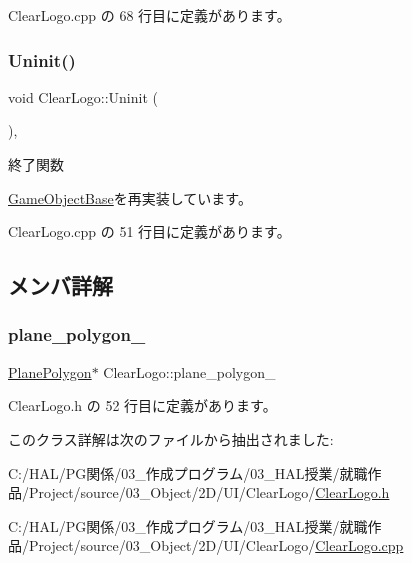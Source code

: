  Clear\+Logo.\+cpp の 68 行目に定義があります。

\mbox{\label{class_clear_logo_ab55def116615b92a8e8cc40b364b7a4c}} 
\subsubsection{\texorpdfstring{Uninit()}{Uninit()}}
{\footnotesize\ttfamily void Clear\+Logo\+::\+Uninit (\begin{DoxyParamCaption}{ }\end{DoxyParamCaption})\hspace{0.3cm}{\ttfamily [override]}, {\ttfamily [virtual]}}



終了関数 



\mbox{\hyperlink{class_game_object_base_a97e1bc277d7b1c0156d4735de29a022c}{Game\+Object\+Base}}を再実装しています。



 Clear\+Logo.\+cpp の 51 行目に定義があります。



\subsection{メンバ詳解}
\mbox{\label{class_clear_logo_ad4c1abbd7e501cc44357c9f65e12482f}} 
\subsubsection{\texorpdfstring{plane\+\_\+polygon\+\_\+}{plane\_polygon\_}}
{\footnotesize\ttfamily \mbox{\hyperlink{class_plane_polygon}{Plane\+Polygon}}$\ast$ Clear\+Logo\+::plane\+\_\+polygon\+\_\+}



 Clear\+Logo.\+h の 52 行目に定義があります。



このクラス詳解は次のファイルから抽出されました\+:\begin{DoxyCompactItemize}
\item 
C\+:/\+H\+A\+L/\+P\+G関係/03\+\_\+作成プログラム/03\+\_\+\+H\+A\+L授業/就職作品/\+Project/source/03\+\_\+\+Object/2\+D/\+U\+I/\+Clear\+Logo/\mbox{\hyperlink{_clear_logo_8h}{Clear\+Logo.\+h}}\item 
C\+:/\+H\+A\+L/\+P\+G関係/03\+\_\+作成プログラム/03\+\_\+\+H\+A\+L授業/就職作品/\+Project/source/03\+\_\+\+Object/2\+D/\+U\+I/\+Clear\+Logo/\mbox{\hyperlink{_clear_logo_8cpp}{Clear\+Logo.\+cpp}}\end{DoxyCompactItemize}
